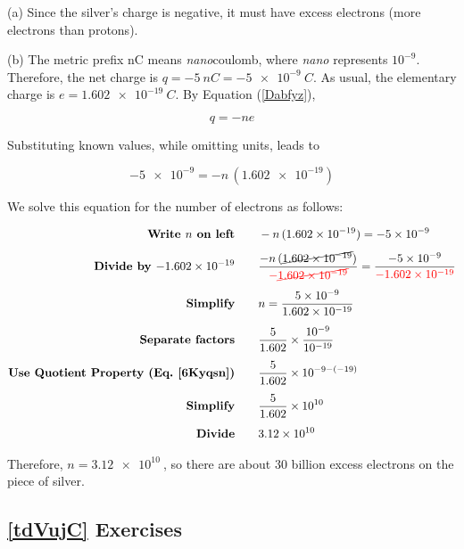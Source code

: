 \documentclass[dvipsnames]{article}
\numberwithin{equation}{section}
\numberwithin{figure}{section}
\begin{document}
\Solution (a) Since the silver's charge is negative, it must have excess electrons (more electrons than protons).

\vspace{1em}

(b) The metric prefix nC means \textit{nano}coulomb, where \textit{nano} represents $10^{-9}$. Therefore, the net charge is $q = \SI{-5}{nC} = \SI{-5e-9}{C}$. As usual, the elementary charge is $e= \SI{1.602e-19}{C}$. By Equation (\ref{Dabfyz}),

\begin{equation*}
    q = -ne
\end{equation*}

Substituting known values, while omitting units, leads to

\begin{equation*}
     \num{-5e-9} = - n\,(\num{1.602e-19})
\end{equation*}

We solve this equation for the number of electrons as follows:

\begin{align*}
    \textbf{Write $n$ on left} \qquad & - n\,(\SI{1.602e-19}{}) = \SI{-5e-9}{}\\[1ex]
    \textbf{Divide by \SI{-1.602e-19}{}} \qquad & \frac{- n\,(\cancel{\SI{1.602e-19}{}})}{\mathbin{\color{red} -} \textcolor{red}{\cancel{\SI{1.602e-19}{}}}} = \frac{\SI{-5e-9}{}}{\mathbin{\color{red} -} \textcolor{red}{\SI{1.602e-19}{}}}\\[1ex]
    \textbf{Simplify} \qquad & n = \frac{\qty{5e-9}{}}{\qty{1.602e-19}{}}\\[1ex]
    \textbf{Separate factors} \qquad & \frac{5}{1.602} \times \frac{10^{-9}}{10^{-19}}\\[1ex]
    \textbf{Use Quotient Property (Eq.~\ref{6Kyqsn})} \qquad & \frac{5}{1.602} \times 10^{-9 - (-19)}\\[1ex]
    \textbf{Simplify} \qquad & \frac{5}{1.602} \times 10^{10}\\[1ex]
    \textbf{Divide} \qquad & \SI{3.12e10}{}
\end{align*}

Therefore, $n = \SI{3.12e10}{}$, so there are about 30 billion excess electrons on the piece of silver.

\vspace{1em}
\cyanhrule

\subsection*{\ref{tdVujC} Exercises}
\end{document}
